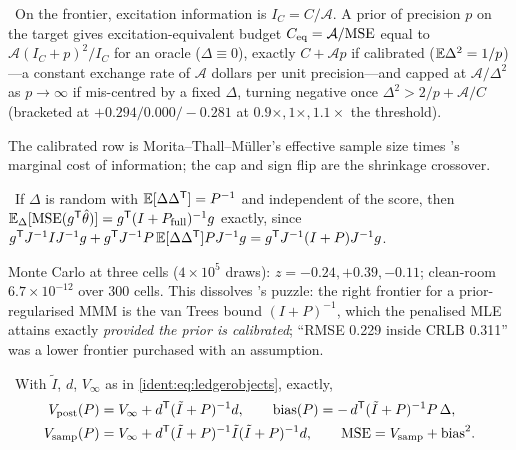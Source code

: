 \begin{proposition}
\label{ident:prop:exchange}
\tagTransported\ On the frontier, excitation information is $I_C = C/\mathcal A$. A prior of precision $p$ on the target gives excitation-equivalent budget $C_{\rm eq} = \mathcal A/\mathrm{MSE}$ equal to $\mathcal A(I_C + p)^2/I_C$ for an oracle ($\Delta \equiv 0$), exactly $C + \mathcal Ap$ if calibrated ($\mathbb{E}\Delta^2 = 1/p$)---a constant exchange rate of $\mathcal A$ dollars per unit precision---and capped at $\mathcal A/\Delta^2$ as $p \to \infty$ if mis-centred by a fixed $\Delta$, turning negative once $\Delta^2 > 2/p + \mathcal A/C$ (bracketed at $+0.294/0.000/-0.281$ at $0.9\times, 1\times, 1.1\times$ the threshold).
\end{proposition}

The calibrated row is Morita--Thall--M\"uller's effective sample size times 's marginal cost of information; the cap and sign flip are the shrinkage crossover.

\begin{theorem}
\label{ident:thm:vantrees}
\tagEstablished\ If $\Delta$ is random with $\mathbb{E}[\Delta\Delta^{\mathsf{T}}] = P^{-1}$ and independent of the score, then $\mathbb{E}_\Delta[\mathrm{MSE}(g^{\mathsf{T}}\hat\theta)] = g^{\mathsf{T}}(I + P_{\rm full})^{-1}g$ exactly, since $g^{\mathsf{T}} J^{-1}IJ^{-1}g + g^{\mathsf{T}} J^{-1}P\,\mathbb{E}[\Delta\Delta^{\mathsf{T}}]PJ^{-1}g = g^{\mathsf{T}} J^{-1}(I + P)J^{-1}g$.
\end{theorem}

Monte Carlo at three cells ($4\times10^5$ draws): $z = -0.24, +0.39, -0.11$; clean-room $6.7\times10^{-12}$ over 300 cells. This dissolves 's puzzle: the right frontier for a prior-regularised MMM is the van Trees bound $(I + P)^{-1}$, which the penalised MLE attains exactly \emph{provided the prior is calibrated}; ``RMSE 0.229 inside CRLB 0.311'' was a lower frontier purchased with an assumption.

\begin{theorem}
\label{ident:thm:ledger}
\tagEstablished\ With $\tilde I$, $d$, $V_\infty$ as in \cref{ident:eq:ledgerobjects}, exactly,
\begin{align}
V_{\rm post}(P) &= V_\infty + d^{\mathsf{T}}(\tilde I + P)^{-1}d, \qquad \mathrm{bias}(P) = -\,d^{\mathsf{T}}(\tilde I + P)^{-1}P\,\Delta, \label{ident:eq:ledger1}\\
V_{\rm samp}(P) &= V_\infty + d^{\mathsf{T}}(\tilde I + P)^{-1}\tilde I(\tilde I + P)^{-1}d, \qquad \mathrm{MSE} = V_{\rm samp} + \mathrm{bias}^2. \label{ident:eq:ledger2}
\end{align}
\end{theorem}

